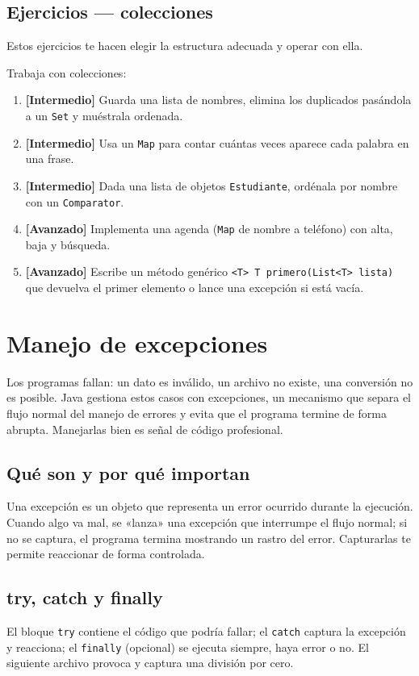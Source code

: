 \documentclass[11pt]{article}
\begin{document}
\subsection{Ejercicios — colecciones}
Estos ejercicios te hacen elegir la estructura adecuada y operar con ella.

Trabaja con colecciones:

\begin{enumerate}[leftmargin=1.7em,itemsep=3pt,topsep=2pt]
\item \textbf{[Intermedio]} Guarda una lista de nombres, elimina los duplicados pasándola a un \texttt{Set} y muéstrala ordenada.
\item \textbf{[Intermedio]} Usa un \texttt{Map} para contar cuántas veces aparece cada palabra en una frase.
\item \textbf{[Intermedio]} Dada una lista de objetos \texttt{Estudiante}, ordénala por nombre con un \texttt{Comparator}.
\item \textbf{[Avanzado]} Implementa una agenda (\texttt{Map} de nombre a teléfono) con alta, baja y búsqueda.
\item \textbf{[Avanzado]} Escribe un método genérico \texttt{\textless{}T\textgreater{} T primero(List\textless{}T\textgreater{} lista)} que devuelva el primer elemento o lance una excepción si está vacía.
\end{enumerate}
\section{Manejo de excepciones}
Los programas fallan: un dato es inválido, un archivo no existe, una conversión no es posible. Java gestiona estos casos con excepciones, un mecanismo que separa el flujo normal del manejo de errores y evita que el programa termine de forma abrupta. Manejarlas bien es señal de código profesional.

\subsection{Qué son y por qué importan}
Una excepción es un objeto que representa un error ocurrido durante la ejecución. Cuando algo va mal, se «lanza» una excepción que interrumpe el flujo normal; si no se captura, el programa termina mostrando un rastro del error. Capturarlas te permite reaccionar de forma controlada.

\subsection{try, catch y finally}
El bloque \texttt{try} contiene el código que podría fallar; el \texttt{catch} captura la excepción y reacciona; el \texttt{finally} (opcional) se ejecuta siempre, haya error o no. El siguiente archivo provoca y captura una división por cero.
\end{document}
